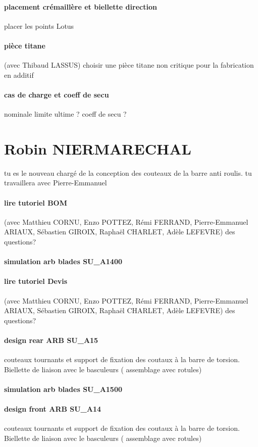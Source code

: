 \paragraph{placement crémaillère et biellette direction} placer les points Lotus
\paragraph{pièce titane} (avec Thibaud LASSUS) choisir une pièce titane non critique pour la fabrication en additif
\paragraph{cas de charge et coeff de secu} nominale limite ultime ? coeff de secu ?

 
 \newpage \section*{Robin NIERMARECHAL} 
 \par tu es le nouveau chargé de la conception des couteaux de la barre anti roulis. tu travaillera avec Pierre-Emmanuel
\paragraph{lire tutoriel BOM} (avec Matthieu CORNU, Enzo POTTEZ, Rémi FERRAND, Pierre-Emmanuel ARIAUX, Sébastien GIROIX, Raphaël CHARLET, Adèle LEFEVRE) des questions?
\paragraph{simulation arb blades SU\_A1400} 
\paragraph{lire tutoriel Devis} (avec Matthieu CORNU, Enzo POTTEZ, Rémi FERRAND, Pierre-Emmanuel ARIAUX, Sébastien GIROIX, Raphaël CHARLET, Adèle LEFEVRE) des questions?
\paragraph{design rear ARB SU\_A15} couteaux tournants et support de fixation des coutaux à la barre de torsion. Biellette de liaison avec le basculeurs ( assemblage avec rotules)
\paragraph{simulation arb blades SU\_A1500} 
\paragraph{design front ARB SU\_A14} couteaux tournants et support de fixation des coutaux à la barre de torsion. Biellette de liaison avec le basculeurs ( assemblage avec rotules)
